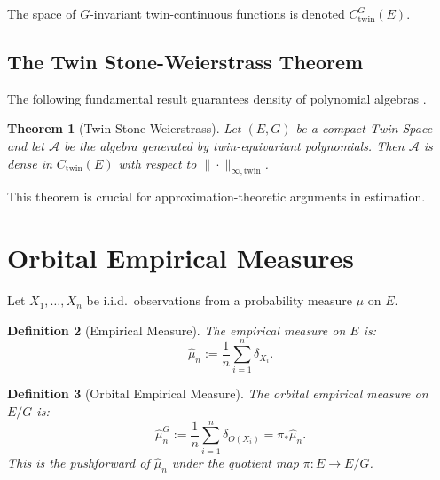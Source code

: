 \documentclass[11pt]{article}
\newtheorem{theorem}{Theorem}[section]
\newtheorem{definition}[theorem]{Definition}
\begin{document}
The space of $G$-invariant twin-continuous functions is denoted $C_{\mathrm{twin}}^G(E)$.

\subsection{The Twin Stone-Weierstrass Theorem}

The following fundamental result guarantees density of polynomial algebras \citep{Stone1948,Nachbin1965}.

\begin{theorem}[Twin Stone-Weierstrass]\label{thm:stone_weierstrass}
Let $(E, G)$ be a compact Twin Space and let $\mathcal{A}$ be the algebra generated by twin-equivariant polynomials. Then $\mathcal{A}$ is dense in $C_{\mathrm{twin}}(E)$ with respect to $\|\cdot\|_{\infty,\mathrm{twin}}$.
\end{theorem}

This theorem is crucial for approximation-theoretic arguments in estimation.

\section{Orbital Empirical Measures}
\label{sec:orbital_measures}

Let $X_1, \ldots, X_n$ be i.i.d.\ observations from a probability measure $\mu$ on $E$.

\begin{definition}[Empirical Measure]\label{def:empirical}
The empirical measure on $E$ is:
\begin{equation}\label{eq:empirical}
\hat{\mu}_n := \frac{1}{n} \sum_{i=1}^n \delta_{X_i}.
\end{equation}
\end{definition}

\begin{definition}[Orbital Empirical Measure]\label{def:orbital_empirical}
The orbital empirical measure on $E/G$ is:
\begin{equation}\label{eq:orbital_empirical}
\hat{\mu}_n^G := \frac{1}{n} \sum_{i=1}^n \delta_{O(X_i)} = \pi_* \hat{\mu}_n.
\end{equation}
This is the pushforward of $\hat{\mu}_n$ under the quotient map $\pi : E \to E/G$.
\end{definition}
\end{document}
